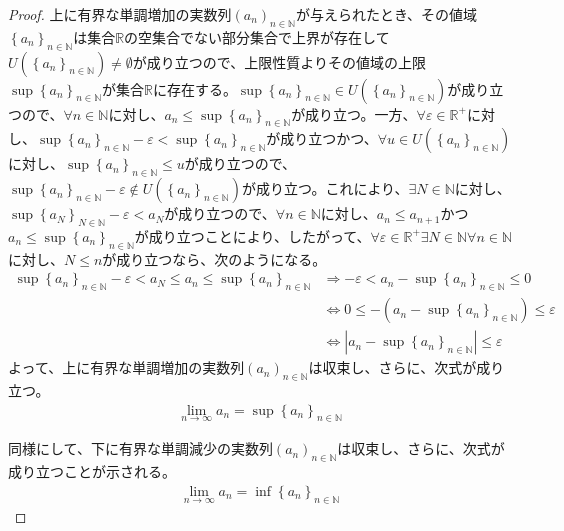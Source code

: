 \documentclass[dvipdfmx]{jsarticle}
\begin{document}
\begin{proof}
上に有界な単調増加の実数列$\left( a_{n} \right)_{n \in \mathbb{N}}$が与えられたとき、その値域$\left\{ a_{n} \right\}_{n \in \mathbb{N}}$は集合$\mathbb{R}$の空集合でない部分集合で上界が存在して$U\left( \left\{ a_{n} \right\}_{n \in \mathbb{N}} \right) \neq \emptyset$が成り立つので、上限性質よりその値域の上限$\sup\left\{ a_{n} \right\}_{n \in \mathbb{N}}$が集合$\mathbb{R}$に存在する。$\sup\left\{ a_{n} \right\}_{n \in \mathbb{N}} \in U\left( \left\{ a_{n} \right\}_{n \in \mathbb{N}} \right)$が成り立つので、$\forall n \in \mathbb{N}$に対し、$a_{n} \leq \sup\left\{ a_{n} \right\}_{n \in \mathbb{N}}$が成り立つ。一方、$\forall\varepsilon \in \mathbb{R}^{+}$に対し、$\sup\left\{ a_{n} \right\}_{n \in \mathbb{N}} - \varepsilon < \sup\left\{ a_{n} \right\}_{n \in \mathbb{N}}$が成り立つかつ、$\forall u \in U\left( \left\{ a_{n} \right\}_{n \in \mathbb{N}} \right)$に対し、$\sup\left\{ a_{n} \right\}_{n \in \mathbb{N}} \leq u$が成り立つので、$\sup\left\{ a_{n} \right\}_{n \in \mathbb{N}} - \varepsilon \notin U\left( \left\{ a_{n} \right\}_{n \in \mathbb{N}} \right)$が成り立つ。これにより、$\exists N \in \mathbb{N}$に対し、$\sup\left\{ a_{N} \right\}_{N \in \mathbb{N}} - \varepsilon < a_{N}$が成り立つので、$\forall n \in \mathbb{N}$に対し、$a_{n} \leq a_{n + 1}$かつ$a_{n} \leq \sup\left\{ a_{n} \right\}_{n \in \mathbb{N}}$が成り立つことにより、したがって、$\forall\varepsilon \in \mathbb{R}^{+}\exists N \in \mathbb{N}\forall n\mathbf{\in}\mathbb{N}$に対し、$N \leq n$が成り立つなら、次のようになる。
\begin{align*}
\sup\left\{ a_{n} \right\}_{n \in \mathbb{N}} - \varepsilon < a_{N} \leq a_{n} \leq \sup\left\{ a_{n} \right\}_{n \in \mathbb{N}} &\Rightarrow - \varepsilon < a_{n} - \sup\left\{ a_{n} \right\}_{n \in \mathbb{N}} \leq 0\\
&\Leftrightarrow 0 \leq - \left( a_{n} - \sup\left\{ a_{n} \right\}_{n \in \mathbb{N}} \right) \leq \varepsilon\\
&\Leftrightarrow \left| a_{n} - \sup\left\{ a_{n} \right\}_{n \in \mathbb{N}} \right| \leq \varepsilon
\end{align*}
よって、上に有界な単調増加の実数列$\left( a_{n} \right)_{n \in \mathbb{N}}$は収束し、さらに、次式が成り立つ。
\begin{align*}
\lim_{n \rightarrow \infty}a_{n} = \sup\left\{ a_{n} \right\}_{n \in \mathbb{N}}
\end{align*}\par
同様にして、下に有界な単調減少の実数列$\left( a_{n} \right)_{n \in \mathbb{N}}$は収束し、さらに、次式が成り立つことが示される。
\begin{align*}
\lim_{n \rightarrow \infty}a_{n} = \inf\left\{ a_{n} \right\}_{n \in \mathbb{N}}
\end{align*}
\end{proof}
\end{document}
